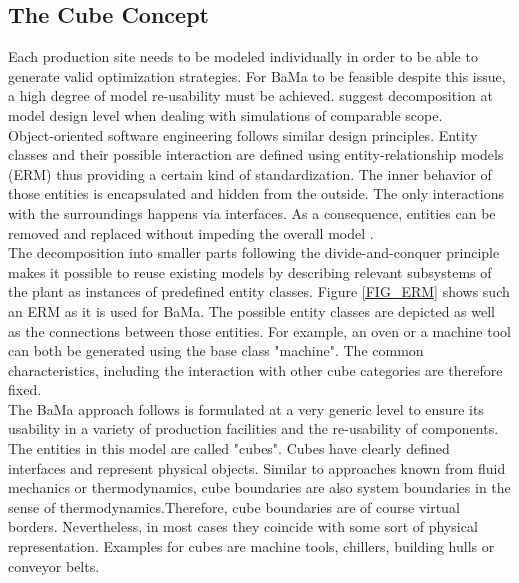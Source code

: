 \documentclass[3p,times,procedia,twocolumn,twoside]{elsarticle}
\begin{document}
\subsection{The Cube Concept}
\label{CHAP_CubeConcept}
Each production site needs to be modeled individually in order to be able to generate valid optimization strategies. For BaMa to be feasible despite this issue, a high degree of model re-usability must be achieved. \cite{Balci2012,Setavoraphan2008} suggest decomposition at model design level when dealing with simulations of comparable scope.\\
Object-oriented software engineering follows similar design principles. Entity classes and their possible interaction are defined using entity-relationship models (ERM) thus providing a certain kind of standardization. The inner behavior of those entities is encapsulated and hidden from the outside. The only interactions with the surroundings happens via interfaces. As a consequence, entities can be removed and replaced without impeding  the overall model \cite{Schatten2010}.\\
The decomposition into smaller parts following the \linebreak divide-and-conquer principle makes it possible to reuse existing models by describing relevant subsystems of the plant as instances of predefined entity classes.
Figure \ref{FIG_ERM} shows such an ERM as it is used for BaMa. The possible entity classes are depicted as well as the connections between those entities. For example, an oven or a machine tool can both be generated using the base class "machine". The common characteristics, including the interaction with other cube categories are therefore fixed.\\
The BaMa approach follows is formulated at a very generic level to ensure its usability in a variety of production facilities and the re-usability of components. The entities in this model are called "cubes". Cubes have clearly defined interfaces and represent physical objects. Similar to approaches known from fluid mechanics or thermodynamics, cube boundaries are also system boundaries in the sense of thermodynamics.\linebreak Therefore, cube boundaries are of course virtual borders. Nevertheless, in most cases they coincide with some sort of physical representation. Examples for cubes are machine tools, chillers, building hulls or conveyor belts.
\end{document}
